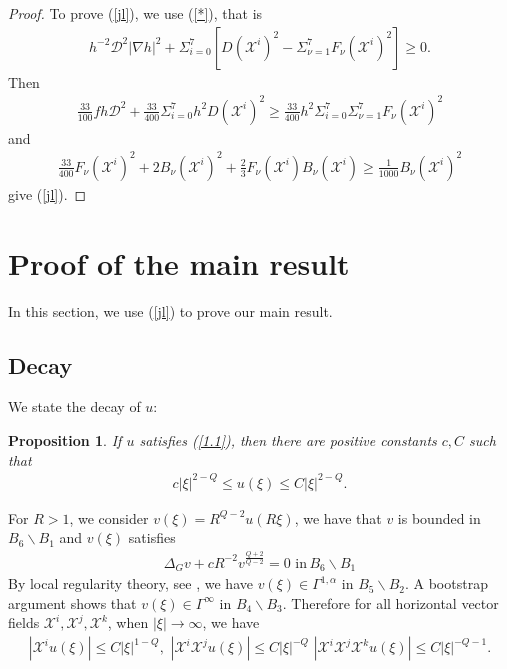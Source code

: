 \documentclass[reqno,12pt]{amsart}
\numberwithin{equation}{section}
\theoremstyle{plain}
\newtheorem{proposition}[theorem]{Proposition}
\theoremstyle{definition}
\begin{document}
\begin{proof}
    To prove (\ref{jl}), we use (\ref{*}), that is
    \begin{align*}
        h^{-2}\mathcal{D}^2|\nabla h|^2+\Sigma_{i=0}^7[D(\mathscr{X}^i)^2-\Sigma_{\nu=1}^7F_\nu(\mathscr{X}^i)^2]\geq 0.    \end{align*}
        Then
\begin{align*}
        \frac{33}{100}fh\mathcal{D}^2+\frac{33}{400}\Sigma_{i=0}^7h^2D(\mathscr{X}^i)^2   \geq  \frac{33}{400}h^2\Sigma_{i=0}^7\Sigma_{\nu=1}^7F_\nu(\mathscr{X}^i)^2
    \end{align*}
 and 
 \begin{align*}
     \frac{33}{400}F_\nu(\mathscr{X}^i)^2+2B_\nu(\mathscr{X}^i)^2+\frac{2}{3}F_\nu(\mathscr{X}^i)B_\nu (\mathscr{X}^i)\geq \frac{1}{1000}B_\nu (\mathscr{X}^i)^2
 \end{align*}
 give (\ref{jl}).
\end{proof}


















\section{Proof of the main result }\label{s4}

In this section, we use (\ref{jl}) to prove our main result.
\subsection{Decay} We state the decay of $u$:     
\begin{proposition}\cite{L2019}
    If $u$ satisfies (\ref{1.1}), then there are positive constants $c, C$ such that
    \begin{align}
        c|\xi|^{2-Q}\leq u(\xi)\leq C|\xi|^{2-Q}.
    \end{align}
    \end{proposition}
    For $R>1$, we consider $v(\xi)=R^{Q-2}u(R\xi)$, we have that $v$ is bounded in $B_6\backslash B_1$ and $v(\xi)$ satisfies
    \begin{align*}
        \Delta_G v+cR^{-2}v^\frac{Q+2}{Q-2}=0\,\,\textrm{in}\,B_6\backslash B_1
    \end{align*}
By local regularity theory, see \cite{F1975}, we have $v(\xi)\in \Gamma^{1,\alpha}$ in $B_5\backslash B_2$. A bootstrap argument shows that $v(\xi) \in \Gamma^{\infty}$ in $B_4\backslash B_3$. Therefore for all horizontal vector fields $\mathscr{X}^i, \mathscr{X}^j, \mathscr{X}^k$, when $|\xi|\rightarrow \infty$, we have 
\begin{align}\label{est}
    |\mathscr{X}^iu(\xi)|\leq C|\xi|^{1-Q},\,\,|\mathscr{X}^i\mathscr{X}^j u(\xi)|\leq C |\xi|^{-Q}\,\,|\mathscr{X}^i\mathscr{X}^j\mathscr{X}^k u(\xi)|\leq C|\xi|^{-Q-1}.  
\end{align}
\end{document}
